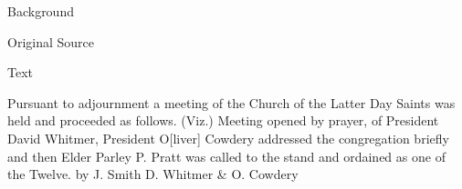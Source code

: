 				\begin{description}
					\item[Background]
				\end{description}
				
				
				\begin{description}
					\item[Original Source]
				\end{description}
				
				
				\begin{description}
					\item[Text]
				\end{description}
				

					Pursuant to adjournment a meeting of the Church of the Latter Day Saints was held and proceeded as follows. (Viz.) Meeting opened by prayer, of President David Whitmer, President O[liver] Cowdery addressed the congregation briefly and then Elder Parley P. Pratt was called to the stand and ordained as one of the Twelve. by J. Smith  D. Whitmer \& O. Cowdery

